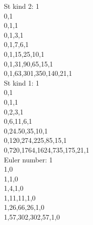 \begin{multicols}{3}
St kind 2: 1\\
0,1\\
0,1,1\\
0,1,3,1\\
0,1,7,6,1\\
0,1,15,25,10,1\\
0,1,31,90,65,15,1\\
0,1,63,301,350,140,21,1\\
St kind 1: 1\\
0,1\\
0,1,1\\
0,2,3,1\\
0,6,11,6,1\\
0,24.50,35,10,1\\
0,120,274,225,85,15,1\\
0,720,1764,1624,735,175,21,1\\
Euler number: 1 \\
1,0\\
1,1,0\\
1,4,1,0\\
1,11,11,1,0\\
1,26,66,26,1,0\\
1,57,302,302,57,1,0\\
\end{multicols}